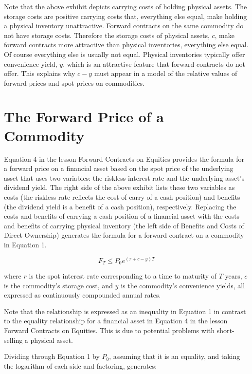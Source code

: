 \documentclass[11pt]{article}
\begin{document}
Note that the above exhibit depicts carrying costs of holding physical assets. The storage costs are positive carrying costs that, everything else equal, make holding a physical inventory unattractive. Forward contracts on the same commodity do not have storage costs. Therefore the storage costs of physical assets, $c$, make forward contracts more attractive than physical inventories, everything else equal. Of course everything else is usually not equal. Physical inventories typically offer convenience yield, $y$, which is an attractive feature that forward contracts do not offer. This explains why $c-y$ must appear in a model of the relative values of forward prices and spot prices on commodities.

\section*{The Forward Price of a Commodity}
Equation 4 in the lesson Forward Contracts on Equities provides the formula for a forward price on a financial asset based on the spot price of the underlying asset that uses two variables: the riskless interest rate and the underlying asset's dividend yield. The right side of the above exhibit lists these two variables as costs (the riskless rate reflects the cost of carry of a cash position) and benefits (the dividend yield is a benefit of a cash position), respectively. Replacing the costs and benefits of carrying a cash position of a financial asset with the costs and benefits of carrying physical inventory (the left side of Benefits and Costs of Direct Ownership) generates the formula for a forward contract on a commodity in Equation 1.


\begin{equation*}
F_{T} \leq P_{0} e^{(r+c-y) T} \tag{1}
\end{equation*}


where $r$ is the spot interest rate corresponding to a time to maturity of $T$ years, $c$ is the commodity's storage cost, and $y$ is the commodity's convenience yields, all expressed as continuously compounded annual rates.

Note that the relationship is expressed as an inequality in Equation 1 in contrast to the equality relationship for a financial asset in Equation 4 in the lesson Forward Contracts on Equities. This is due to potential problems with short-selling a physical asset.

Dividing through Equation 1 by $P_{0}$, assuming that it is an equality, and taking the logarithm of each side and factoring, generates:
\end{document}
